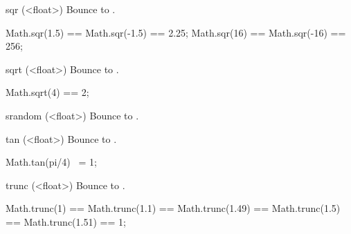 \begin{urbiscriptapi}
\item[sqr](<float>)%
  Bounce to .
\begin{urbiassert}
Math.sqr(1.5) == Math.sqr(-1.5) == 2.25;
Math.sqr(16)  == Math.sqr(-16)  == 256;
\end{urbiassert}


\item[sqrt](<float>)%
  Bounce to .
\begin{urbiassert}
Math.sqrt(4) == 2;
\end{urbiassert}


\item[srandom](<float>)%
  Bounce to .


\item[tan](<float>)%
  Bounce to .
\begin{urbiassert}
Math.tan(pi/4) ~= 1;
\end{urbiassert}


\item[trunc](<float>)%
  Bounce to .
\begin{urbiassert}
Math.trunc(1) == Math.trunc(1.1) == Math.trunc(1.49) == Math.trunc(1.5)
  == Math.trunc(1.51)
  == 1;
\end{urbiassert}
\end{urbiscriptapi}


